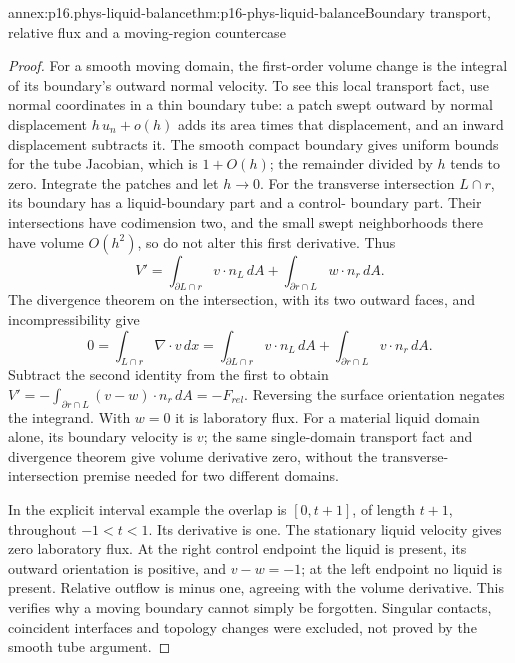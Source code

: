 \begin{annexitem}{annex:p16.phys-liquid-balance}{thm:p16-phys-liquid-balance}{Boundary transport, relative flux and a moving-region countercase}
\begin{proof}
For a smooth moving domain, the first-order volume change is the integral
of its boundary's outward normal velocity. To see this local transport
fact, use normal coordinates in a thin boundary tube: a patch swept
outward by normal displacement \(h\,u_n+o(h)\) adds its area times
that displacement, and an inward displacement subtracts it. The smooth
compact boundary gives uniform bounds for the tube Jacobian, which is
\(1+O(h)\); the remainder divided by \(h\) tends to zero.
Integrate the patches and let \(h\to0\). For the transverse intersection
\(L\cap r\), its boundary has a liquid-boundary part and a control-
boundary part. Their intersections have codimension two, and the small
swept neighborhoods there have volume \(O(h^2)\), so do not alter this
first derivative. Thus
\[
 V'=\int_{\partial L\cap r}v\cdot n_L\,dA
       +\int_{\partial r\cap L}w\cdot n_r\,dA.
\]
The divergence theorem on the intersection, with its two outward faces,
and incompressibility give
\[
 0=\int_{L\cap r}\nabla\cdot v\,dx
   =\int_{\partial L\cap r}v\cdot n_L\,dA
       +\int_{\partial r\cap L}v\cdot n_r\,dA.
\]
Subtract the second identity from the first to obtain
\(V'=-\int_{\partial r\cap L}(v-w)\cdot n_r\,dA=-F_{rel}\).
Reversing the surface orientation negates the integrand. With \(w=0\)
it is laboratory flux. For a material liquid domain alone, its boundary
velocity is \(v\); the same single-domain transport fact and divergence
theorem give volume derivative zero, without the transverse-intersection
premise needed for two different domains.

In the explicit interval example the overlap is \([0,t+1]\), of
length \(t+1\), throughout \(-1<t<1\). Its derivative is one.
The stationary liquid velocity gives zero laboratory flux. At the right
control endpoint the liquid is present, its outward orientation is positive,
and \(v-w=-1\); at the left endpoint no liquid is present. Relative
outflow is minus one, agreeing with the volume derivative. This verifies
why a moving boundary cannot simply be forgotten. Singular contacts,
coincident interfaces and topology changes were excluded, not proved by
the smooth tube argument.
\end{proof}
\end{annexitem}

